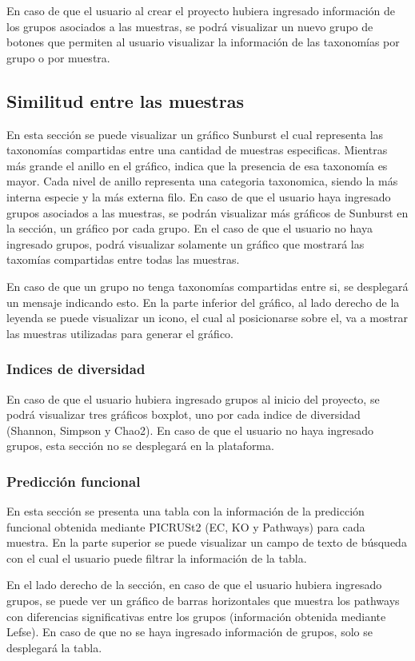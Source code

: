 En caso de que el usuario al crear el proyecto hubiera ingresado información de los grupos asociados a las muestras, se podrá visualizar un nuevo grupo de botones que permiten al usuario visualizar la información de las taxonomías por grupo o por muestra.
\subsection{Similitud entre las muestras}
En esta sección se puede visualizar un gráfico Sunburst el cual representa las taxonomías compartidas entre una cantidad de muestras especificas. Mientras más grande el anillo en el gráfico, indica que la presencia de esa taxonomía es mayor. Cada nivel de anillo representa una categoria taxonomica, siendo la más interna especie y la más externa filo.
En caso de que el usuario haya ingresado grupos asociados a las muestras, se podrán visualizar más gráficos de Sunburst en la sección, un gráfico por cada grupo. En el caso de que el usuario no haya ingresado grupos, podrá visualizar solamente un gráfico que mostrará las taxomías compartidas entre todas las muestras.

En caso de que un grupo no tenga taxonomías compartidas entre si, se desplegará un mensaje indicando esto.
En la parte inferior del gráfico, al lado derecho de la leyenda se puede visualizar un icono, el cual al posicionarse sobre el, va a mostrar las muestras utilizadas para generar el gráfico.
\subsubsection{Indices de diversidad}
En caso de que el usuario hubiera ingresado grupos al inicio del proyecto, se podrá visualizar tres gráficos boxplot, uno por cada indice de diversidad (Shannon, Simpson y Chao2). En caso de que el usuario no haya ingresado grupos, esta sección no se desplegará en la plataforma.
\subsubsection{Predicción funcional}
En esta sección se presenta una tabla con la información de la predicción funcional obtenida mediante PICRUSt2 (EC, KO y Pathways) para cada muestra. En la parte superior se puede visualizar un campo de texto de búsqueda con el cual el usuario puede filtrar la información de la tabla.

En el lado derecho de la sección, en caso de que el usuario hubiera ingresado grupos, se puede ver un gráfico de barras horizontales que muestra los pathways con diferencias significativas entre los grupos (información obtenida mediante Lefse). En caso de que no se haya ingresado información de grupos, solo se desplegará la tabla.
